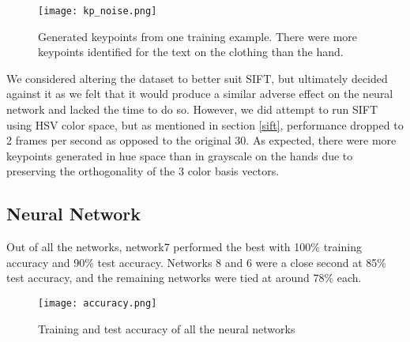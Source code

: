 \begin{figure}[h]
\texttt{[image: kp\_noise.png]}
\centering
\caption{Generated keypoints from one training example. There were more keypoints identified for the text on the clothing than the hand.}
\label{kp_noise}
\end{figure}

We considered altering the dataset to better suit SIFT, but ultimately decided against it as we felt that it would produce a similar adverse effect on the neural network and lacked the time to do so. However, we did attempt to run SIFT using HSV color space, but as mentioned in section \ref{sift}, performance dropped to 2 frames per second as opposed to the original 30. As expected, there were more keypoints generated in hue space than in grayscale on the hands due to preserving the orthogonality of the 3 color basis vectors.

\subsection{Neural Network}
\label{perf_NN}

Out of all the networks, network7 performed the best with 100\% training accuracy and 90\% test accuracy. Networks 8 and 6 were a close second at 85\% test accuracy, and the remaining networks were tied at around 78\% each.

\begin{figure}[h]
\texttt{[image: accuracy.png]}
\centering
\caption{Training and test accuracy of all the neural networks}
\end{figure}